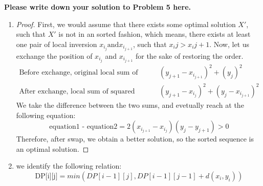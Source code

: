 \documentclass[11pt,twoside]{article}
\newenvironment{solution}{{\par\noindent\it Solution.}}{}
\begin{document}
\begin{solution}
\textbf{Please write down your solution to Problem 5 here.}\begin{enumerate}\item
\begin{proof}
First, we would assume that there exists some optimal solution $X'$, such that $X'$ is not in an sorted fashion, which means, there exists at least one pair of local inversion $x_{i_{j}}\text{and}x_{i_{j+1}}$, such that $x_{i}{j}>x_{i}{j+1}$.
Now, let us exchange the position of $x_{i_{j}}$ and $x_{i_{j+1}}$ for the sake of restoring the order. \begin{align*}
    \text{Before exchange, original local sum of squared distance}& (y_{j+1}-x_{i_{j+1}})^{2} + (y_{j})^{2}\tag{equation 1}\\
    \text{After exchange, local sum of squared distance}& (y_{j+1}-x_{i_{j}})^{2}+(y_{j}-x_{i_{j+1}})^{2}\tag{equation2}
\end{align*}
We take the difference between the two sums, and evetually reach at the following equation: $$\text{equation1 - equation2}= 2(x_{i_{j+1}}-x_{i_{j}})(y_{j}-y_{j+1}) > 0$$ Therefore, after swap, we obtain a better solution, so the sorted sequence is an optimal solution.
\end{proof}
\item
we identify the following relation: $$\text{DP[i][j]} = min(DP[i-1][j], DP[i-1][j-1]+ d(x_{i},y_{i}))$$

\end{enumerate}
\end{solution}
\end{document}
